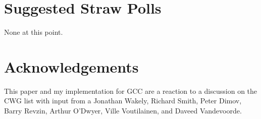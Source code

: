 \section{Suggested Straw Polls}
None at this point.

\section{Acknowledgements}
This paper and my implementation for GCC are a reaction to a discussion on the CWG list 
with input from a Jonathan Wakely, Richard Smith, Peter Dimov, Barry Revzin, Arthur 
O'Dwyer, Ville Voutilainen, and Daveed Vandevoorde.


